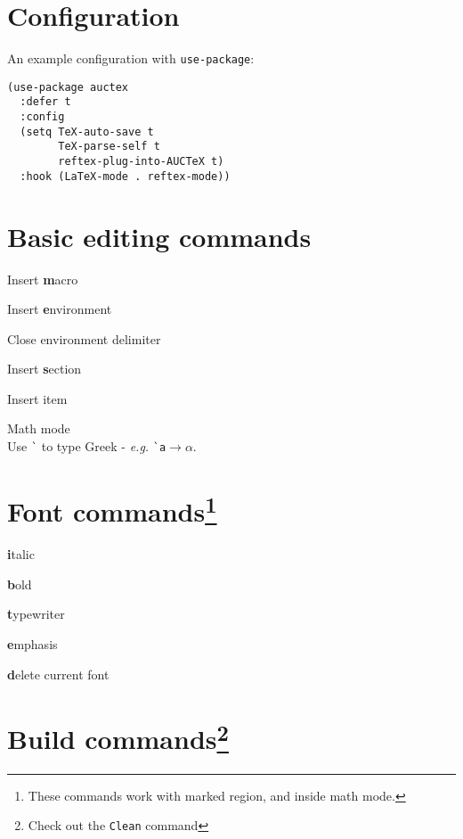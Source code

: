 \documentclass[landscape]{article}
\newcommand{\kbd}[1]{\colorbox{gray!10!}{\texttt{#1}}}
\newcommand{\doctitle}{\texttt{AUC}\TeX \hspace{.25em} Cheatsheet}
\newcommand{\element}[2][-]{\item[#1] \parbox[t]{\linewidth}{#2}}
\begin{document}
\hspace*{\fill}{\huge \bfseries \doctitle \hspace*{\fill}}
\vspace{2em}
  
\begin{multicols}{3}

\section*{Configuration}

An example configuration with \texttt{use-package}:
  
\begin{Verbatim}
(use-package auctex
  :defer t
  :config
  (setq TeX-auto-save t
        TeX-parse-self t
        reftex-plug-into-AUCTeX t)
  :hook (LaTeX-mode . reftex-mode))
\end{Verbatim}

\section*{Basic editing commands}

\begin{description}[align=left,labelwidth=1.5cm]
\element[\kbd{C-c C-m}]{ Insert \textbf{m}acro }
\element[\kbd{C-c C-e}]{ Insert \textbf{e}nvironment }
\element[\kbd{C-c ]}]{   Close environment delimiter }
\element[\kbd{C-c C-s}]{ Insert \textbf{s}ection }
\element[\kbd{C-c C-j}]{ Insert item }
\element[\kbd{C-c \~}] { Math mode\\
  Use \texttt{\`} to type Greek - \textit{e.g.} \texttt{\`}\texttt{a}$\rightarrow\alpha$. }
\end{description}


\section*{Font commands\footnote{ These commands work with marked region, and inside math mode.}}
\label{sec:font-commands}

\begin{description}[align=left,labelwidth=1.5cm]
\element[\kbd{C-c C-f C-i}]{ \textbf{i}talic \hfill }
\element[\kbd{C-c C-f C-b}]{ \textbf{b}old }
\element[\kbd{C-c C-f C-t}]{ \textbf{t}ypewriter }
\element[\kbd{C-c C-f C-t}]{ \textbf{e}mphasis }
\element[\kbd{C-c C-f C-d}]{ \textbf{d}elete current font }
\end{description}

\section*{Build commands\footnote{ Check out the \texttt{Clean} command}}


\end{multicols}
\end{document}
